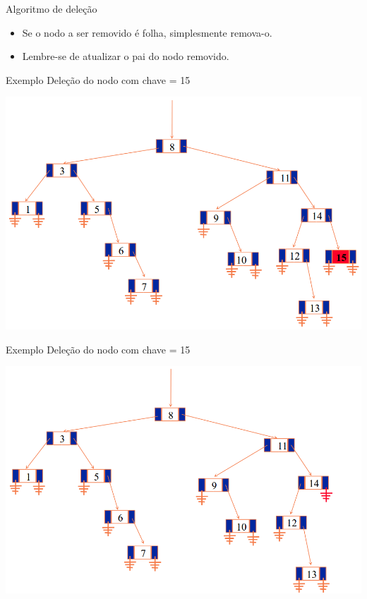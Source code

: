 \documentclass[12pt,table,xcolor={dvipsnames}]{beamer}
\begin{document}
\begin{frame}[fragile]{Algoritmo de deleção}
	\begin{itemize}
		\item Se o nodo a ser removido é folha, simplesmente remova-o.
		\item Lembre-se de atualizar o pai do nodo removido.
	\end{itemize}
\end{frame}

\begin{frame}[fragile]{Exemplo}
Deleção do nodo com chave = 15
\begin{center}
\includegraphics[scale=.3]{arv8.png} 
\end{center}
\end{frame}

\begin{frame}[fragile]{Exemplo}
Deleção do nodo com chave = 15
\begin{center}
\includegraphics[scale=.3]{arv9.png} 
\end{center}
\end{frame}
\end{document}
